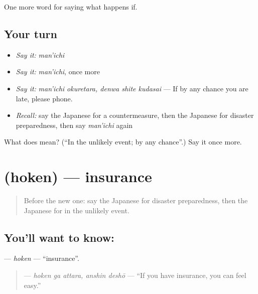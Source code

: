 \begin{grammarlens}[title={What you've built}]
One more word for saying what happens if.
\end{grammarlens}

\subsection*{Your turn}
\begin{itemize}
\raggedright
  \item \emph{Say it:} \emph{man'ichi}
  \item \emph{Say it:} \emph{man'ichi}, once more
  \item \emph{Say it:} \emph{man'ichi okuretara, denwa shite kudasai} — If by any chance you are late, please phone.
  \item \emph{Recall:} say the Japanese for a countermeasure, then the Japanese for disaster preparedness, then say \emph{man'ichi} again
\end{itemize}

\begin{tcolorbox}[breakable,colback=teal!4,colframe=teal!35!black,title={Before you move on}]
What does  mean? (\textquotedblleft{}In the unlikely event; by any chance\textquotedblright{}.) Say it once more.
\end{tcolorbox}
\section[\texorpdfstring{\ja{ほけん} (hoken)}{ほけん (hoken)}]{ (hoken) — insurance}

\label{lesson:JA-C351-hoken}



\begin{quote}
Before the new one: say the Japanese for disaster preparedness, then the Japanese for in the unlikely event.
\end{quote}

\subsection*{You'll want to know: }
\textbf{} — \emph{hoken} — \textquotedblleft{}insurance\textquotedblright{}.

\begin{quote}
\textbf{ } — \emph{hoken ga attara, anshin deshō} — \textquotedblleft{}If you have insurance, you can feel easy.\textquotedblright{}
\end{quote}

